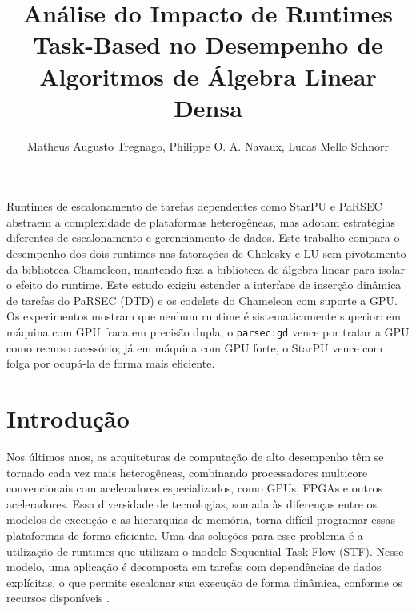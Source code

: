 \documentclass[12pt]{article}
\date{}
\title{Análise do Impacto de Runtimes Task-Based no Desempenho de Algoritmos de Álgebra Linear Densa}
\begin{document}
\makeatletter
\let\orgtitle\@title
\makeatother

\title{\orgtitle}

\author{
   Matheus Augusto Tregnago,
   Philippe O. A. Navaux,
   Lucas Mello Schnorr
}

\address{
   Institute of Informatics, Federal University of Rio Grande do Sul (UFRGS)\\
   Caixa Postal 15.064 -- 91.501-970 -- Porto Alegre -- RS -- Brazil
}

\maketitle

\begin{resumo}
Runtimes de escalonamento de tarefas dependentes como StarPU e PaRSEC abstraem a
complexidade de plataformas heterogêneas, mas adotam estratégias diferentes de
escalonamento e gerenciamento de dados. Este trabalho compara o desempenho dos
dois runtimes nas fatorações de Cholesky e LU sem pivotamento da biblioteca
Chameleon, mantendo fixa a biblioteca de álgebra linear para isolar o efeito do
runtime. Este estudo exigiu estender a interface de inserção dinâmica de tarefas
do PaRSEC (DTD) e os codelets do Chameleon com suporte a GPU. Os experimentos
mostram que nenhum runtime é sistematicamente superior: em máquina com GPU fraca
em precisão dupla, o \texttt{parsec:gd} vence por tratar a GPU como
recurso acessório; já em máquina com GPU forte, o StarPU vence com folga por
ocupá-la de forma mais eficiente.
\end{resumo}
\section{Introdução}
\label{sec:org4573efe}
Nos últimos anos, as arquiteturas de computação de alto desempenho têm se
tornado cada vez mais heterogêneas, combinando processadores multicore
convencionais com aceleradores especializados, como GPUs, FPGAs e outros
aceleradores. Essa diversidade de tecnologias, somada às diferenças entre os
modelos de execução e as hierarquias de memória, torna difícil programar essas
plataformas de forma eficiente. Uma das soluções para esse problema é a
utilização de runtimes que utilizam o modelo Sequential Task Flow (STF). Nesse
modelo, uma aplicação é decomposta em tarefas com dependências de dados
explícitas, o que permite escalonar sua execução de forma dinâmica, conforme os
recursos disponíveis \cite{10025520}.
\end{document}
